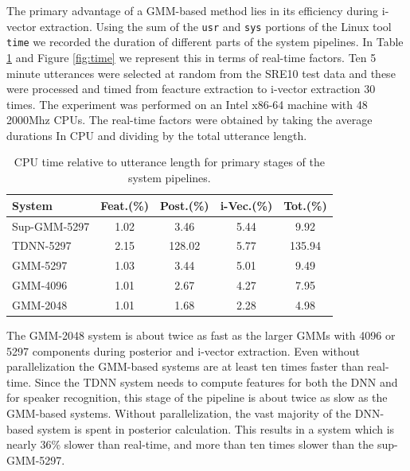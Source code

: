 \documentclass{article}
\begin{document}
The primary advantage of a GMM-based method lies in its
efficiency during i-vector extraction. Using the sum of the \texttt{usr}
and \texttt{sys}
portions of the Linux tool \texttt{time} we recorded the duration of
different parts of the system pipelines. In Table \ref{timing} and
Figure \ref{fig:time} we represent this in terms of real-time factors.
Ten 5 minute utterances
were selected at random from the SRE10 test data and these were processed
and timed from feacture extraction to i-vector extraction 30 times. The
experiment was performed on an Intel x86-64 machine with 48 2000Mhz CPUs.
The real-time factors were obtained by taking the average durations In CPU and
dividing by the total utterance length. 

\begin{table}
\caption{CPU time relative to utterance length for primary stages of the system pipelines.}
\begin{center}
\begin{tabular}{l|cccc}
\hline
System & Feat.(\%) & Post.(\%) & i-Vec.(\%) & Tot.(\%) \\ \hline \hline
Sup-GMM-5297 & 1.02 & 3.46 & 5.44 & 9.92 \\
TDNN-5297 & 2.15 & 128.02 & 5.77 & 135.94 \\
GMM-5297 & 1.03 & 3.44 & 5.01 & 9.49 \\
GMM-4096 & 1.01 & 2.67 & 4.27 & 7.95 \\
GMM-2048 & 1.01 & 1.68 & 2.28 & 4.98 \\ \hline
\end{tabular}
\end{center}
\label{timing}
\end{table}


The GMM-2048 system is about twice as fast as the
larger GMMs with 4096 or 5297 components during posterior and i-vector
extraction. Even without
parallelization the GMM-based systems are at least ten times faster than
real-time. Since the TDNN system needs to compute features for both the
DNN and for speaker recognition, this stage of the pipeline is about twice
as slow as the GMM-based systems.
Without parallelization, the vast majority of the DNN-based system is spent 
in posterior calculation. This results in a system which is nearly 36\% slower 
than real-time, and more than ten times slower than the sup-GMM-5297.
\end{document}
